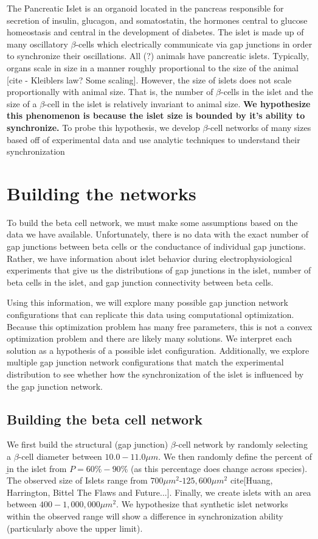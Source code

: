 \documentclass[10pt]{report}
\newcommand{\bb}{$\beta$-cell }
\newcommand{\bs}{$\beta$-cells }
\begin{document}
The Pancreatic Islet is an organoid located in the pancreas responsible for secretion of insulin, glucagon, and somatostatin, the hormones central to glucose homeostasis and central in the development of diabetes.  The islet is made up of many oscillatory \bs which electrically communicate via gap junctions in order to synchronize their oscillations.  All (?) animals have pancreatic islets.  Typically, organs scale in size in a manner roughly proportional to the size of the animal [cite - Kleiblers law? Some scaling]. However, the size of islets does not scale proportionally with animal size. That is, the number of \bs in the islet and the size of a \bb in the islet is relatively invariant to animal size.  \textbf{We hypothesize this phenomenon is because the islet size is bounded by it's ability to synchronize.} To probe this hypothesis, we develop \bb networks of many sizes based off of experimental data and use analytic techniques to understand their synchronization 


\section{Building the networks}
To build the beta cell network, we must make some assumptions based on the data we have available. Unfortunately, there is no data with the exact number of gap junctions between beta cells or the conductance of individual gap junctions. Rather, we have information about islet behavior during electrophysiological experiments that give us the distributions of gap junctions in the islet, number of beta cells in the islet, and gap junction connectivity between beta cells. 

Using this information, we will explore many possible gap junction network configurations that can replicate this data using computational optimization. Because this optimization problem has many free parameters, this is not a convex optimization problem and there are likely many solutions. We interpret each solution as a hypothesis of a possible islet configuration.  Additionally, we explore multiple gap junction network configurations that match the experimental distribution to see whether how the synchronization of the islet is influenced by the gap junction network.

\subsection{Building the beta cell network}
We first build the structural (gap junction) \bb network by randomly selecting a  \bb diameter between $10.0-11.0 \mu m$. We then randomly define the percent of \b in the islet from $P = 60\%-90\%$ (as this percentage does change across species). The observed size of Islets range from $700\mu m^2$-$125,600\mu m^2$ cite[Huang, Harrington, Bittel The Flaws and Future...]. Finally,  we create islets with an area between $400-1,000,000 \mu m^2$. We hypothesize that synthetic islet networks within the observed range will show a difference in synchronization ability (particularly above the upper limit).  
\end{document}
